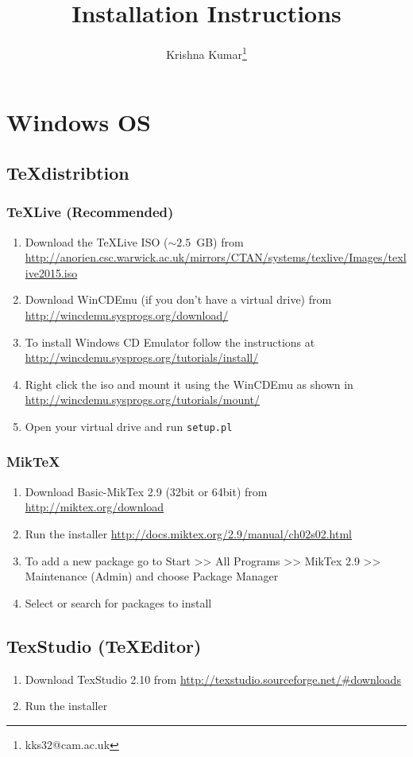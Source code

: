 \documentclass[times,twoside,11pt]{article}
\title{\LaTeXe  Installation Instructions}
\author{Krishna Kumar\thanks{kks32@cam.ac.uk}}
\date{}
\begin{document}
\maketitle

\section*{Windows OS}
\subsection*{\TeX distribtion}
\subsubsection*{\TeX Live (Recommended)}
\begin{enumerate}
\item	Download the \TeX Live ISO ($\sim 2.5$~GB) from 
\url{http://anorien.csc.warwick.ac.uk/mirrors/CTAN/systems/texlive/Images/texlive2015.iso}
\item	Download WinCDEmu (if you don't have a virtual drive) from 
\url{http://wincdemu.sysprogs.org/download/}
\item	To install Windows CD Emulator follow the instructions at 
\url{http://wincdemu.sysprogs.org/tutorials/install/}
\item	Right click the iso and mount it using the WinCDEmu as shown in 
\url{http://wincdemu.sysprogs.org/tutorials/mount/}
\item	Open your virtual drive and run \verb|setup.pl|
\end{enumerate}

\subsubsection*{Mik\TeX}
\begin{enumerate}
\item	Download Basic-MikTex 2.9 (32bit or 64bit) from 
\url{http://miktex.org/download}
\item	Run the installer 
\url{http://docs.miktex.org/2.9/manual/ch02s02.html}
\item	To add a new package go to Start >> All Programs >> MikTex 2.9 >> 
Maintenance (Admin) and choose Package Manager
\item	Select or search for packages to install
\end{enumerate}


\subsection*{TexStudio (\TeX Editor)}
\begin{enumerate}
\item	Download TexStudio 2.10 from 
\url{http://texstudio.sourceforge.net/\#downloads} 
\item	Run the installer
\end{enumerate}
\end{document}
